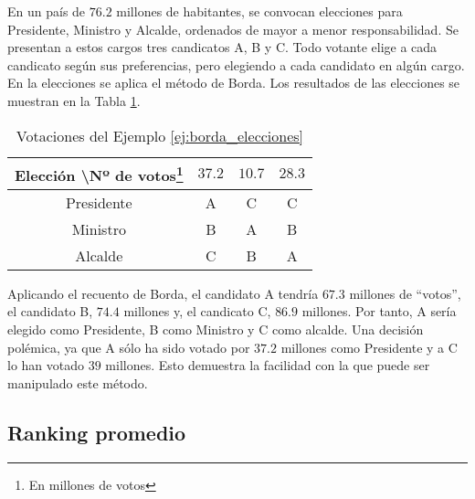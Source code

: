 \begin{ejemplo}\label{ej:borda_elecciones} 

En un país de $76.2$ millones de habitantes, se convocan elecciones para Presidente, Ministro y Alcalde, ordenados de mayor a menor responsabilidad. Se presentan a estos cargos tres candicatos A, B y C. Todo votante elige a cada candicato según sus preferencias, pero elegiendo a cada candidato en algún cargo. En la elecciones se aplica el método de Borda. Los resultados de las elecciones se muestran en la Tabla \ref{tbl:borda_elecciones}.
 
\begin{savenotes}
\begin{table}[h]
\centering
\caption{Votaciones del Ejemplo \ref{ej:borda_elecciones}}
\label{tbl:borda_elecciones}
\begin{tabular}{@{}cccc@{}}
\toprule
Elección \textbackslash Nº de votos\footnote{En millones de votos} & $37.2$ & $10.7$ & $28.3$ \\ \midrule
Presidente           & A    & C    & C    \\
Ministro             & B    & A    & B    \\
Alcalde              & C    & B    & A    \\ \bottomrule
\end{tabular}
\end{table}
\end{savenotes}

Aplicando el recuento de Borda, el candidato A tendría $67.3$ millones de ``votos'', el candidato B, $74.4$ millones y, el candicato C, $86.9$ millones. Por tanto, A sería elegido como Presidente, B como Ministro y C como alcalde. Una decisión polémica, ya que A sólo ha sido votado por $37.2$ millones como Presidente y a C lo han votado $39$ millones. Esto demuestra la facilidad con la que puede ser manipulado este método.  

\end{ejemplo}


\subsection{Ranking promedio}

